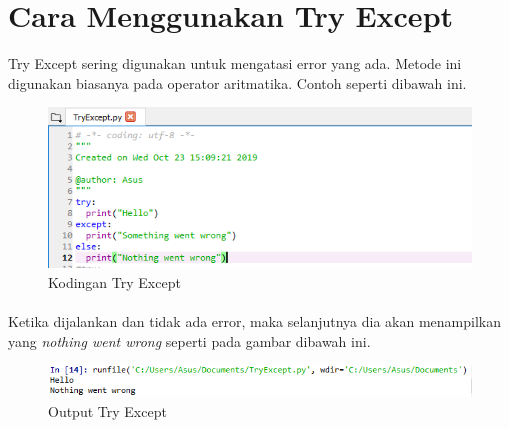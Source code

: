 \documentclass{article}
\begin{document}
\section{Cara Menggunakan Try Except}
Try Except sering digunakan untuk mengatasi error yang ada. Metode ini digunakan biasanya pada operator aritmatika. Contoh seperti dibawah ini.
\begin{figure}[!htbp]
    \centering
    \includegraphics[scale=0.6]{TryExcept.PNG}
    \caption{Kodingan Try Except}
\end{figure}
\paragraph{}
Ketika dijalankan dan tidak ada error, maka selanjutnya dia akan menampilkan yang \textit{nothing went wrong} seperti pada gambar dibawah ini.
\begin{figure}[!htbp]
    \centering
    \includegraphics[scale=0.6]{OutputTryExcept.PNG}
    \caption{Output Try Except}
\end{figure}
\end{document}
